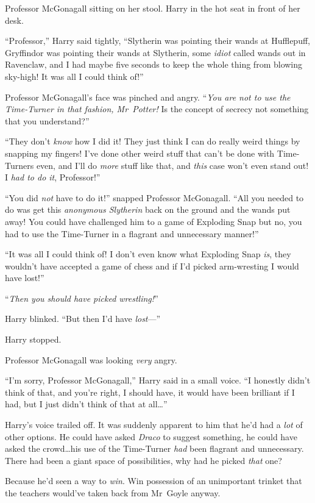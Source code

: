 Professor McGonagall sitting on her stool. Harry in the hot seat in front of her desk.

“Professor,” Harry said tightly,
“Slytherin was pointing their wands at Hufflepuff, Gryffindor was pointing their wands at Slytherin, some \emph{idiot} called wands out in Ravenclaw, and I had maybe five seconds to keep the whole thing from blowing sky-high! It was all I could think of!”

Professor McGonagall’s face was pinched and angry. “\emph{You are not to use the Time-Turner in that fashion, Mr~Potter!} Is the concept of secrecy not something that you understand?”

“They don’t \emph{know} how I did it! They just think I can do really weird things by snapping my fingers! I’ve done other weird stuff that can’t be done with Time-Turners even, and I’ll do \emph{more} stuff like that, and \emph{this} case won’t even stand out! I \emph{had to do it}, Professor!”

“You did \emph{not} have to do it!” snapped Professor McGonagall.
“All you needed to do was get this \emph{anonymous Slytherin} back on the ground and the wands put away! You could have challenged him to a game of Exploding Snap but no, you had to use the Time-Turner in a flagrant and unnecessary manner!”

“It was all I could think of! I don’t even know what Exploding Snap \emph{is}, they wouldn’t have accepted a game of chess and if I’d picked arm-wresting I would have lost!”

“\emph{Then you should have picked wrestling!}”

Harry blinked.
“But then I’d have \emph{lost}—”

Harry stopped.

Professor McGonagall was looking \emph{very} angry.

“I’m sorry, Professor McGonagall,” Harry said in a small voice.
“I honestly didn’t think of that, and you’re right, I should have, it would have been brilliant if I had, but I just didn’t think of that at all…”

Harry’s voice trailed off. It was suddenly apparent to him that he’d had a \emph{lot} of other options. He could have asked \emph{Draco} to suggest something, he could have asked the crowd…his use of the Time-Turner \emph{had} been flagrant and unnecessary. There had been a giant space of possibilities, why had he picked \emph{that} one?

Because he’d seen a way to \emph{win}. Win possession of an unimportant trinket that the teachers would’ve taken back from Mr~Goyle anyway.


